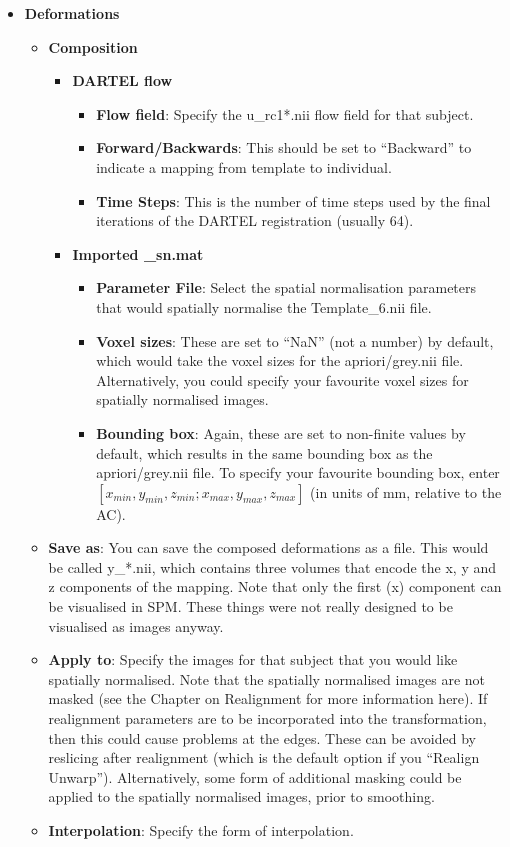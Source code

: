 \begin{itemize}
\item{{\bf Deformations}
  \begin{itemize}
  \item{{\bf Composition}
    \begin{itemize}
    \item{{\bf DARTEL flow}
      \begin{itemize}
      \item{{\bf Flow field}: Specify the u\_rc1*.nii flow field for that subject.}
      \item{{\bf Forward/Backwards}: This should be set to ``Backward'' to indicate a mapping from template to individual.}
      \item{{\bf Time Steps}: This is the number of time steps used by the final iterations of the DARTEL registration (usually 64).}
      \end{itemize}
    }
    \item{{\bf Imported \_sn.mat}
      \begin{itemize}
      \item{{\bf Parameter File}: Select the spatial normalisation parameters that would spatially normalise the Template\_6.nii file.}
      \item{{\bf Voxel sizes}: These are set to ``NaN'' (not a number) by default, which would take the voxel sizes for the apriori/grey.nii file.  Alternatively, you could specify your favourite voxel sizes for spatially normalised images.}
      \item{{\bf Bounding box}: Again, these are set to non-finite values by default, which results in the same bounding box as the apriori/grey.nii file.  To specify your favourite bounding box, enter $[x_{min}, y_{min}, z_{min}; x_{max}, y_{max}, z_{max}]$ (in units of mm, relative to the AC).}
      \end{itemize}
    }
    \end{itemize}
  }
  \item{{\bf Save as}: You can save the composed deformations as a file. This would be called y\_*.nii, which contains three volumes that encode the x, y and z components of the mapping.  Note that only the first (x) component can be visualised in SPM. These things were not really designed to be visualised as images anyway.}
  \item{{\bf Apply to}: Specify the images for that subject that you would like spatially normalised. Note that the spatially normalised images are not masked (see the Chapter on Realignment for more information here).  If realignment parameters are to be incorporated into the transformation, then this could cause problems at the edges.  These can be avoided by reslicing after realignment (which is the default option if you ``Realign Unwarp'').  Alternatively, some form of additional masking  could be applied to the spatially normalised images, prior to smoothing.}
  \item{{\bf Interpolation}: Specify the form of interpolation.}
  \end{itemize}
}
\end{itemize}

